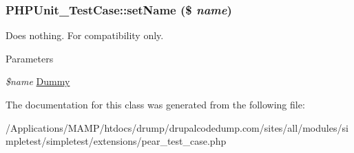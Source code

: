 \hypertarget{class_p_h_p_unit___test_case_a976c20907e244e08e662e51428534171}{
\subsubsection[{setName}]{\setlength{\rightskip}{0pt plus 5cm}PHPUnit\_\-TestCase::setName (\$ {\em name})}}
\label{class_p_h_p_unit___test_case_a976c20907e244e08e662e51428534171}
Does nothing. For compatibility only. 
\begin{DoxyParams}{Parameters}
\item[{\em \$name}]\hyperlink{class_dummy}{Dummy} \end{DoxyParams}


The documentation for this class was generated from the following file:\begin{DoxyCompactItemize}
\item 
/Applications/MAMP/htdocs/drump/drupalcodedump.com/sites/all/modules/simpletest/simpletest/extensions/pear\_\-test\_\-case.php\end{DoxyCompactItemize}
